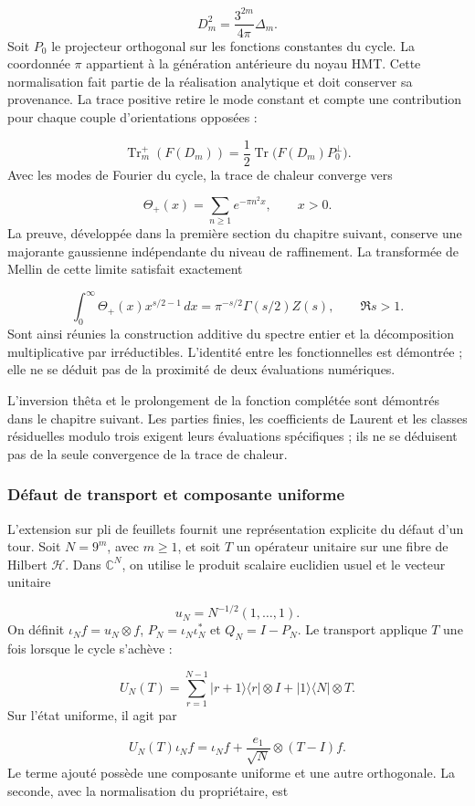 \[
D_m^2=\frac{3^{2m}}{4\pi}\Delta_m.
\]
Soit \(P_0\) le projecteur orthogonal sur les fonctions constantes du cycle. La coordonnée $\pi$ appartient à la génération antérieure du noyau HMT. Cette normalisation fait partie de la réalisation analytique et doit conserver sa provenance. La trace positive retire le mode constant et compte une contribution pour chaque couple d’orientations opposées :

\[
\operatorname{Tr}_m^+(F(D_m))
=\frac12\operatorname{Tr}\bigl(F(D_m)P_0^\perp\bigr).
\]
Avec les modes de Fourier du cycle, la trace de chaleur converge vers

\[
\Theta_+(x)=\sum_{n\ge1}e^{-\pi n^2x},\qquad x>0.
\]
La preuve, développée dans la première section du chapitre suivant, conserve une majorante gaussienne indépendante du niveau de raffinement. La transformée de Mellin de cette limite satisfait exactement

\[
\int_0^\infty\Theta_+(x)x^{s/2-1}\,dx
=\pi^{-s/2}\Gamma(s/2)Z(s),\qquad \Re s>1.
\]
Sont ainsi réunies la construction additive du spectre entier et la décomposition multiplicative par irréductibles. L'identité entre les fonctionnelles est démontrée ; elle ne se déduit pas de la proximité de deux évaluations numériques.

L'inversion thêta et le prolongement de la fonction complétée sont démontrés dans le chapitre suivant. Les parties finies, les coefficients de Laurent et les classes résiduelles modulo trois exigent leurs évaluations spécifiques ; ils ne se déduisent pas de la seule convergence de la trace de chaleur.

\subsubsection*{Défaut de transport et composante uniforme}
L’extension sur pli de feuillets fournit une représentation explicite du défaut d’un tour. Soit \(N=9^m\), avec \(m\ge1\), et soit \(T\) un opérateur unitaire sur une fibre de Hilbert \(\mathcal H\). Dans \(\mathbb C^N\), on utilise le produit scalaire euclidien usuel et le vecteur unitaire

\[
u_N=N^{-1/2}(1,\ldots,1).
\]
On définit \(\iota_Nf=u_N\otimes f\), \(P_N=\iota_N\iota_N^*\) et \(Q_N=I-P_N\). Le transport applique \(T\) une fois lorsque le cycle s'achève :

\[
U_N(T)=\sum_{r=1}^{N-1}|r+1\rangle\langle r|\otimes I
+|1\rangle\langle N|\otimes T.
\]
Sur l'état uniforme, il agit par

\[
U_N(T)\iota_N f
=\iota_N f+\frac{e_1}{\sqrt N}\otimes(T-I)f.
\]
Le terme ajouté possède une composante uniforme et une autre orthogonale. La seconde, avec la normalisation du propriétaire, est

